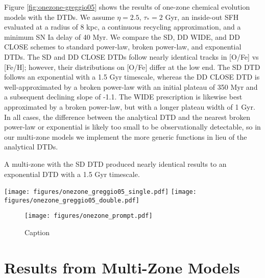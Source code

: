 \documentclass[twocolumn]{aastex631}
\begin{document}
Figure \ref{fig:onezone-greggio05} shows the results of one-zone chemical evolution models with the \citet{Greggio2005-AnalyticalRates} DTDs. We assume $\eta=2.5$, $\tau_*=2$ Gyr, an inside-out SFH evaluated at a radius of 8 kpc, a continuous recycling approximation, and a minimum SN Ia delay of 40 Myr. We compare the SD, DD WIDE, and DD CLOSE schemes to standard power-law, broken power-law, and exponential DTDs. The SD and DD CLOSE DTDs follow nearly identical tracks in [O/Fe] vs [Fe/H]; however, their distributions on [O/Fe] differ at the low end. The SD DTD follows an exponential with a 1.5 Gyr timescale, whereas the DD CLOSE DTD is well-approximated by a broken power-law with an initial plateau of 350 Myr and a subsequent declining slope of -1.1. The WIDE prescription is likewise best approximated by a broken power-law, but with a longer plateau width of 1 Gyr. In all cases, the difference between the analytical DTD and the nearest broken power-law or exponential is likely too small to be observationally detectable, so in our multi-zone models we implement the more generic functions in lieu of the analytical DTDs.

A multi-zone with the \citet{Greggio2005-AnalyticalRates} SD DTD produced nearly identical results to an exponential DTD with a 1.5 Gyr timescale.

\begin{figure*}
    \centering
    \texttt{[image: figures/onezone\_greggio05\_single.pdf]}
    \texttt{[image: figures/onezone\_greggio05\_double.pdf]}
    \caption{Abundance tracks and distributions from one-zone models with the analytical DTDs from \citet{Greggio2005-AnalyticalRates}. \textit{Left:} a comparison between the analytical SD DTD (solid curve), an exponential DTD with a 1.5 Gyr timescale (dashed curve), and a power-law DTD with a slope of -1.1 (dotted curve). \textit{Right:} a comparison between two different prescriptions for an analytical DD DTD (solid curves), power-law DTDs with an initial plateau of 1 Gyr and 350 Myr (dashed curves), and a power-law DTD with no plateau and a slope of -1.1 (dotted curve).}
    \label{fig:onezone-greggio05}
\end{figure*}

\begin{figure}
    \centering
    \texttt{[image: figures/onezone\_prompt.pdf]}
    \caption{Caption}
    \label{fig:onezone-prompt}
\end{figure}

\section{Results from Multi-Zone Models}
\label{sec:multizone-results}
\end{document}
